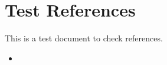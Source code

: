 \documentclass[10pt,a4paper]{article}
\begin{document}
\section*{Test References}
This is a test document to check references.

\begin{itemize}
    \item \cite{news_abr_nodate}
\end{itemize}




\end{document}
